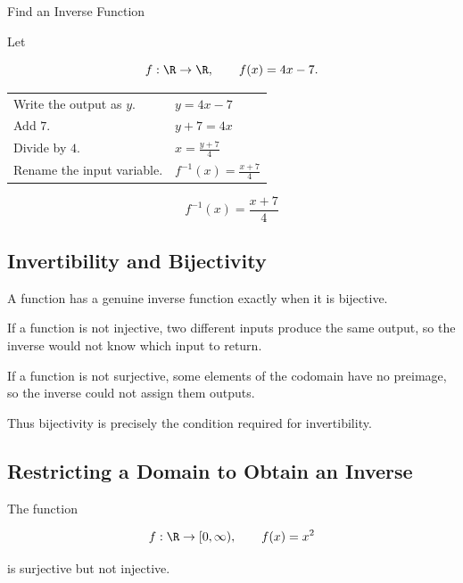 \begin{workedexamplebox}{Find an Inverse Function}

Let

\[ f:\R\to\R,\qquad f(x)=4x-7. \]

\begin{tabularx}{\textwidth}{@{}>{\raggedright\arraybackslash}p{}X@{}}
Write the output as \(y\). & \(y=4x-7\)\\
Add \(7\). & \(y+7=4x\)\\
Divide by \(4\). & \(x=\frac{y+7}{4}\)\\
Rename the input variable. & \(f^{-1}(x)=\frac{x+7}{4}\)
\end{tabularx}

\begin{answerbox}
\[ f^{-1}(x)=\frac{x+7}{4} \]
\end{answerbox}
\end{workedexamplebox}

\subsection{Invertibility and Bijectivity}
\label{subsec:invertibility-bijectivity}

A function has a genuine inverse function exactly when it is bijective.

If a function is not injective, two different inputs produce the same output,
so the inverse would not know which input to return.

If a function is not surjective, some elements of the codomain have no
preimage, so the inverse could not assign them outputs.

Thus bijectivity is precisely the condition required for invertibility.

\subsection{Restricting a Domain to Obtain an Inverse}
\label{subsec:domain-restriction-inverse}

The function

\[ f:\R\to[0,\infty),\qquad f(x)=x^2 \]

is surjective but not injective.

